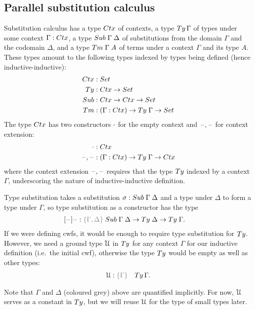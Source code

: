 \documentclass[a4paper,UKenglish,numberwithinsect,cleveref,thm-restate]{lipics-v2021}
\begin{document}
\subsection{Parallel substitution calculus} \label{subsec:SC}

Substitution calculus has a type $\Ctx$ of contexts, a type $\Ty\,\Gamma$ of types under some context $\Gamma : \Ctx$, a type $\Sub\;\Gamma\;\Delta$ of substitutions from the domain $\Gamma$ and the codomain $\Delta$, and a type $\Tm\;\Gamma\;A$ of terms under a context $\Gamma$ and its type $A$. 
These types amount to the following types indexed by types being defined (hence inductive-inductive):
\begin{alignat*}{3}
  \Ctx   & : \Set                   \\
  \Ty    & : \Ctx \to \Set          \\
  \Sub   & : \Ctx \to \Ctx \to \Set \\
  \Tm    & : (\Gamma : \Ctx) \to \Ty\;\Gamma \to \Set
\end{alignat*}
The type $\Ctx$ has two constructors $\cdot$ for the empty context and $\mathord{\hspace{1pt}\text{--}\hspace{1pt}},\mathord{\hspace{1pt}\text{--}\hspace{1pt}}$ for context extension:
\begin{alignat*}{3}
  \emptyctx & : \Ctx \\
  \blank,\blank & : (\Gamma : \Ctx) \to \Ty\;\Gamma \to \Ctx
\end{alignat*}
where the context extension $\mathord{\hspace{1pt}\text{--}\hspace{1pt}},\mathord{\hspace{1pt}\text{--}\hspace{1pt}}$ requires that the type $\Ty$ indexed by a context $\Gamma$, underscoring the nature of inductive-inductive definition.

Type substitution takes a substitution $\sigma : \Sub\;\Gamma\;\Delta$ and a type under $\Delta$ to form a type under $\Gamma$, so type substitution as a constructor has the type
\begin{alignat*}{3}
  [\blank]\blank &: \implicit{\Gamma, \Delta} \; \Sub\;\Gamma\;\Delta \to \Ty\;\Delta \to \Ty\;\Gamma.
\end{alignat*}
If we were defining cwfs, it would be enough to require type substitution for $\Ty$.
However, we need a ground type $\mathcal{U}$ in $\Ty$ for any context $\Gamma$ for our inductive definition (i.e.\ the initial cwf), 
otherwise the type $\Ty$ would be empty as well as other types:
\begin{alignat*}{3}
  \UU & : \implicit{\Gamma} & \Ty\, \Gamma.
\end{alignat*}

Note that $\Gamma$ and $\Delta$ (coloured {\color{gray}grey}) above are quantified implicitly.
For now, $\mathcal{U}$ serves as a constant in $\Ty$, but we will reuse $\mathcal{U}$ for the type of small types later.
\end{document}
